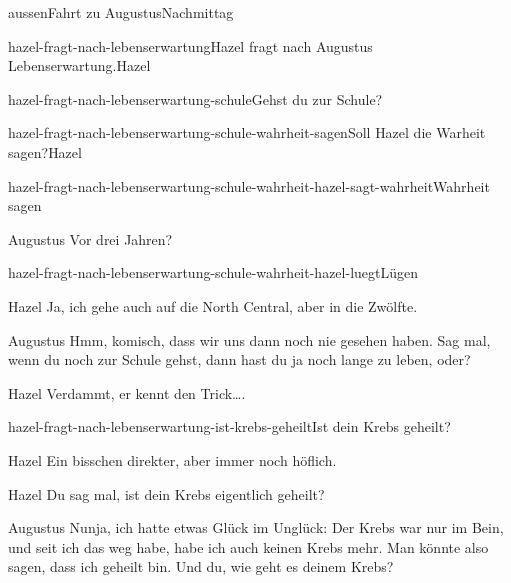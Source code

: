 \documentclass[12pt]{article}
\begin{document}
\begin{scene}{aussen}{Fahrt zu Augustus}{Nachmittag}
\begin{decision}{hazel-fragt-nach-lebenserwartung}{\gls{Hazel} fragt nach \gls{Augustus} Lebenserwartung.}{Hazel}
\begin{option}{hazel-fragt-nach-lebenserwartung-schule}{Gehst du zur Schule?}
\begin{decision}{hazel-fragt-nach-lebenserwartung-schule-wahrheit-sagen}{Soll \gls{Hazel} die Warheit sagen?}{Hazel}
\begin{option}{hazel-fragt-nach-lebenserwartung-schule-wahrheit-hazel-sagt-wahrheit}{Wahrheit sagen}
                        \begin{dialog}[verwundert]{Augustus}
                            Vor drei Jahren?
                        \end{dialog}
                    \end{option}
                    \begin{option}{hazel-fragt-nach-lebenserwartung-schule-wahrheit-hazel-luegt}{Lügen}
                        \begin{dialog}{Hazel}
                            Ja, ich gehe auch auf die North Central, aber in die Zwölfte.
                        \end{dialog}

                        \begin{dialog}[verwundert]{Augustus}
                            Hmm, komisch, dass wir uns dann noch nie gesehen haben.
                            \pause
                            Sag mal, wenn du noch zur Schule gehst, dann hast du ja noch lange zu leben, oder?
                        \end{dialog}

                        \begin{dialog}[In Gedanken]{Hazel}
                            Verdammt, er kennt den Trick….
                        \end{dialog}
                    \end{option}
                \end{decision}
            \end{option}

            \begin{option}{hazel-fragt-nach-lebenserwartung-ist-krebs-geheilt}{Ist dein Krebs geheilt?}
                \begin{dialog}[In Gedanken]{Hazel}
                    Ein bisschen direkter, aber immer noch höflich.
                \end{dialog}

                \begin{dialog}{Hazel}
                    Du sag mal, ist dein Krebs eigentlich geheilt?
                \end{dialog}

                \begin{dialog}{Augustus}
                    Nunja, ich hatte etwas Glück im Unglück:
                    Der Krebs war nur im Bein, und seit ich das weg habe, habe ich auch keinen Krebs mehr.
                    Man könnte also sagen, dass ich geheilt bin.
                    \beat
                    Und du, wie geht es deinem Krebs?
                \end{dialog}
            \end{option}


\end{decision}
\end{scene}
\end{document}
